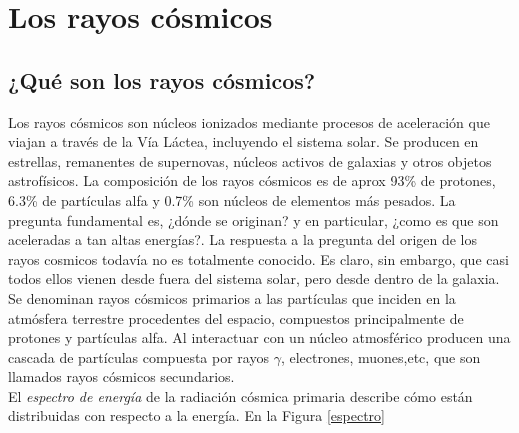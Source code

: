 \chapter{Los rayos cósmicos}

\section{¿Qué son los rayos cósmicos?}

Los rayos cósmicos son núcleos ionizados mediante procesos de aceleración que viajan a través de la Vía Láctea, incluyendo el sistema solar. Se producen en estrellas, remanentes de supernovas, núcleos activos de galaxias y otros objetos astrofísicos. La composición de los rayos cósmicos es de aprox 93\% de protones, 6.3\% de partículas alfa y 0.7\% son núcleos de elementos más pesados. La pregunta fundamental es, ¿dónde se originan? y en particular, ¿como es que son aceleradas a tan altas energías?. La respuesta  a la pregunta del origen de los rayos cosmicos todavía no es totalmente conocido. Es claro, sin embargo, que casi todos ellos vienen desde fuera del sistema solar, pero desde dentro de la galaxia\cite{thomas}.\\

Se denominan rayos cósmicos primarios a las partículas que inciden en la atmósfera terrestre procedentes del espacio, compuestos principalmente de protones y partículas alfa. Al interactuar con un núcleo atmosférico producen una cascada de partículas compuesta por rayos $\gamma$, electrones, muones,etc, que son llamados rayos cósmicos secundarios\cite{spatium}.\\

El \emph{espectro de energía} de la radiación cósmica primaria describe cómo están distribuidas con respecto a la energía. En la Figura \ref{espectro}


